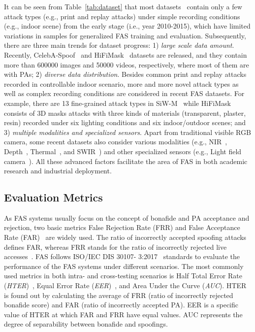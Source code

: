 \documentclass[10pt,journal,compsoc]{IEEEtran}
\begin{document}
It can be seen from Table~\ref{tab:dataset} that most datasets~\cite{tan2010face,peixoto2011face,Zhang2012A,ReplayAttack,kose2013shape,wen2015face,pinto2015using} contain only a few attack types (e.g., print and replay attacks) under simple recording conditions (e.g., indoor scene) from the early stage (i.e., year 2010-2015), which have limited variations in samples for generalized FAS training and evaluation. Subsequently, there are three main trends for dataset progress: 1) \textit{large scale data amount}. Recently, CelebA-Spoof~\cite{zhang2020celeba} and HiFiMask~\cite{liu2021contrastive} datasets are released, and they contain more than 600000 images and 50000 videos, respectively, where most of them are with PAs; 2) \textit{diverse data distribution}. Besides common print and replay attacks recorded in controllable indoor scenario, more and more novel attack types as well as complex recording conditions are considered in recent FAS datasets. For example, there are 13 fine-grained attack types in SiW-M~\cite{liu2019deep} while HiFiMask~\cite{liu2021contrastive} consists of 3D masks attacks with three kinds of materials (transparent, plaster, resin) recorded under six lighting conditions and six indoor/outdoor scenes; and 3) \textit{multiple modalities and specialized sensors}. Apart from traditional visible RGB camera, some recent datasets also consider various modalities (e.g., NIR~\cite{heusch2020deep,li2020casia,casiasurf,george2019biometric}, Depth~\cite{heusch2020deep,li2020casia,casiasurf,george2019biometric}, Thermal~\cite{heusch2020deep,george2019biometric}, and SWIR~\cite{heusch2020deep}) and other specialized sensors (e.g., Light field camera~\cite{raghavendra2015presentation,liu2019light}). All these advanced factors facilitate the area of FAS in both academic research and industrial deployment.   




\vspace{-0.8em}

\subsection{Evaluation Metrics}

As FAS systems usually focus on the concept of bonafide and PA acceptance and rejection, two basic metrics False Rejection Rate (FRR) and False Acceptance Rate (FAR)~\cite{galbally2012high} are widely used. The ratio of incorrectly accepted spoofing attacks defines FAR, whereas FRR stands for the ratio of incorrectly rejected live accesses~\cite{chingovska2014biometrics}. FAS follows ISO/IEC DIS 30107- 3:2017~\cite{iso2017information} standards to evaluate the performance of the FAS systems under different scenarios. The most commonly used metrics in both intra- and cross-testing scenarios is Half Total Error Rate (\textit{HTER})~\cite{chingovska2014biometrics}, Equal Error Rate (\textit{EER})~\cite{ramachandra2017presentation}, and Area Under the Curve (\textit{AUC}). HTER is found out by calculating the average of FRR (ratio of incorrectly rejected bonafide score) and FAR (ratio of incorrectly accepted PA). EER is a specific value of HTER at which FAR and FRR have equal values. AUC represents the degree of separability between bonafide and spoofings. 
\end{document}
